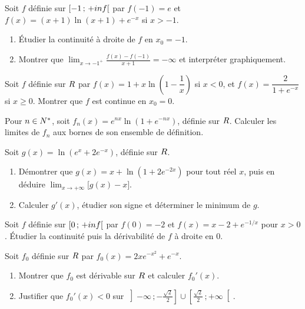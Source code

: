 \begin{annales}
Soit $f$ définie sur $\left[-1\,;\,+inf\right[$ par $f(-1) = e$ et
$f(x) = (x+1)\ln(x+1)+e^{-x}$ si $x>-1$.
\begin{enumerate}[label=\textbf{\alph*)}, leftmargin=*, itemsep=0.15em]
  \item Étudier la continuité à droite de $f$ en $x_{0} = -1$.
  \item Montrer que
        $\displaystyle\lim_{x\to-1^{+}}\frac{f(x)-f(-1)}{x+1} = -\infty$ et
        interpréter graphiquement.
\end{enumerate}

Soit $f$ définie sur $R$ par
$f(x) = 1+x\ln\!\left(1-\dfrac1x\right)$ si $x<0$, et
$f(x) = \dfrac{2}{1+e^{-x}}$ si $x \geq 0$. Montrer que $f$ est continue en
$x_{0} = 0$.

Pour $n\in N^{*}$, soit $f_{n}(x) = e^{nx}\ln\!\left(1+e^{-nx}\right)$,
définie sur $R$. Calculer les limites de $f_{n}$ aux bornes de son ensemble
de définition.

Soit $g(x) = \ln\!\left(e^{x}+2e^{-x}\right)$, définie sur $R$.
\begin{enumerate}[label=\textbf{\alph*)}, leftmargin=*, itemsep=0.15em]
  \item Démontrer que $g(x) = x+\ln\!\left(1+2e^{-2x}\right)$ pour tout réel
        $x$, puis en déduire $\lim_{x\to+\infty}\bigl[g(x)-x\bigr]$.
  \item Calculer $g'(x)$, étudier son signe et déterminer le minimum de $g$.
\end{enumerate}

Soit $f$ définie sur $\left[0\,;\,+inf\right[$ par $f(0) = -2$ et
$f(x) = x-2+e^{-1/x}$ pour $x>0$. Étudier la continuité puis la dérivabilité
de $f$ à droite en $0$.

Soit $f_{0}$ définie sur $R$ par $f_{0}(x) = 2xe^{-x^{2}}+e^{-x}$.
\begin{enumerate}[label=\textbf{\alph*)}, leftmargin=*, itemsep=0.15em]
  \item Montrer que $f_{0}$ est dérivable sur $R$ et calculer $f_{0}'(x)$.
  \item Justifier que $f_{0}'(x)<0$ sur
        $\left]-\infty\,;-\frac{\sqrt2}{2}\right] \cup
         \left[\frac{\sqrt2}{2}\,;+\infty\right[$.
\end{enumerate}


\end{annales}

